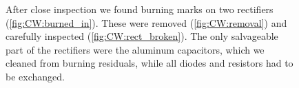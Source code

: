 \begin{refsection}
\begin{figure}[ht]
        \caption{After close inspection we found burning marks on two rectifiers (\ref{fig:CW:burned_in}). These were removed (\ref{fig:CW:removal}) and carefully inspected (\ref{fig:CW:rect_broken}). The only salvageable part of the rectifiers were the aluminum capacitors, which we cleaned from burning residuals, while all diodes and resistors had to be exchanged.}
        \label{fig:CW:broken}
    \end{figure}

    \begin{figure}[ht]   
        \centering
        \\

\end{figure}
\end{refsection}
